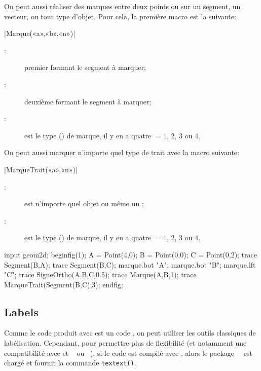 \documentclass[a4paper,french]{article}
\begin{document}
On peut aussi réaliser des marques entre deux points ou sur un segment, un
vecteur, ou tout type d'objet. Pour cela, la première macro est la suivante:
\begin{colourband}
\macro|Marque(«a»,«b»,«n»)|
\begin{description}
  \item[:] premier  formant
  le segment à marquer;
  \item[:] deuxième  formant
  le segment à marquer;
  \item[:] est le type () de marque, il y en a quatre
  $=1$, $2$, $3$ ou $4$.
\end{description}
\end{colourband}

On peut aussi marquer n'importe quel type de trait avec la macro suivante:
\begin{colourband}
\macro|MarqueTrait(«a»,«n»)|
\begin{description}
  \item[:] est n'importe quel objet \mpgeomdd ou même un  \MP;
  \item[:] est le type () de marque, il y en a quatre
  $=1$, $2$, $3$ ou $4$.
\end{description}
\end{colourband}
    
  
\begin{ExempleMP}
input geom2d;
beginfig(1);
A = Point(4,0);
B = Point(0,0);
C = Point(0,2);
trace Segment(B,A);
trace Segment(B,C);
marque.bot "A";
marque.bot "B";
marque.lft "C";
trace SigneOrtho(A,B,C,0.5);
trace Marque(A,B,1);
trace MarqueTrait(Segment(B,C),3);
endfig;
\end{ExempleMP}
  

\subsection{Labels}

Comme le code produit avec \mpgeomdd est un code \MP{}\cite{ctan-metapost}, on peut utiliser les outils
classiques de labélisation. Cependant, pour permettre plus de flexibilité (et
notamment une compatibilité avec  et
~\cite{ctan-luamplib} ou
~\cite{ctan-minim-mp}), si le code est compilé avec \MP{},
alors le package~~\cite{ctan-latexmp} est chargé et fournit la
commande \lstinline+textext()+.
\end{document}
